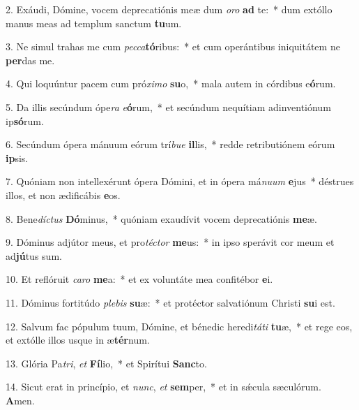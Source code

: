 2. Exáudi, Dómine, vocem deprecatiónis meæ dum \textit{o}\textit{ro} \textbf{ad} te:~*  dum extóllo manus meas ad templum sanctum \textbf{tu}um.\

3. Ne simul trahas me cum \textit{pec}\textit{ca}\textbf{tó}ribus:~*  et cum operántibus iniquitátem ne \textbf{per}das me.\

4. Qui loquúntur pacem cum pró\textit{xi}\textit{mo} \textbf{su}o,~*  mala autem in córdibus e\textbf{ó}rum.\

5. Da illis secúndum ópe\textit{ra} \textit{e}\textbf{ó}rum,~*  et secúndum nequítiam adinventiónum ip\textbf{só}rum.\

6. Secúndum ópera mánuum eórum trí\textit{bu}\textit{e} \textbf{il}lis,~*  redde retributiónem eórum \textbf{ip}sis.\

7. Quóniam non intellexérunt ópera Dómini, et in ópera má\textit{nu}\textit{um} \textbf{e}jus~*  déstrues illos, et non ædificábis \textbf{e}os.\

8. Bene\textit{díc}\textit{tus} \textbf{Dó}minus,~*  quóniam exaudívit vocem deprecatiónis \textbf{me}æ.\

9. Dóminus adjútor meus, et pro\textit{téc}\textit{tor} \textbf{me}us:~*  in ipso sperávit cor meum et ad\textbf{jú}tus sum.\

10. Et reflóruit \textit{ca}\textit{ro} \textbf{me}a:~*  et ex voluntáte mea confitébor \textbf{e}i.\

11. Dóminus fortitúdo \textit{ple}\textit{bis} \textbf{su}æ:~*  et protéctor salvatiónum Christi \textbf{su}i est.\

12. Salvum fac pópulum tuum, Dómine, et bénedic heredi\textit{tá}\textit{ti} \textbf{tu}æ,~*  et rege eos, et extólle illos usque in æ\textbf{tér}num.\

13. Glória Pa\textit{tri}, \textit{et} \textbf{Fí}lio,~*  et Spirítui \textbf{Sanc}to.\

14. Sicut erat in princípio, et \textit{nunc}, \textit{et} \textbf{sem}per,~*  et in sǽcula sæculórum. \textbf{A}men.\

